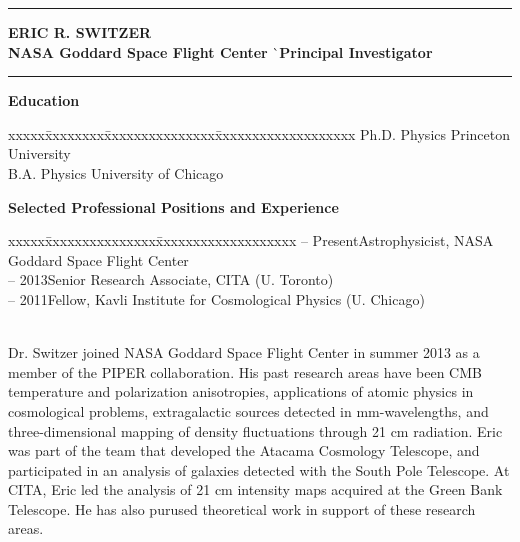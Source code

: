 \documentclass[12pt]{article}
\begin{document}
\hrule height .7pt
\vspace{-3mm}
\noindent
\begin{tabbing}
{\bf ERIC R. SWITZER} \` \\
\small{{\bf NASA Goddard Space Flight Center}} \` \small{{\bf Principal Investigator}} \\
\end{tabbing}
\vspace{-9mm}
\hrule height .7pt

\vspace{5mm}
\small{
\noindent
{\bf Education}
\vspace{-3mm}
\begin{tabbing}
xxxxx\=xxxxxxxx\=xxxxxxxxxxxxxxx\=xxxxxxxxxxxxxxxxxxx\kill
{} \> Ph.D. Physics \> Princeton University \\
 \> B.A. Physics \> University of Chicago \\
\end{tabbing}}

\vspace{-5mm}
\small{
\noindent
{\bf Selected Professional Positions and Experience}
\vspace{-3mm}
\begin{tabbing}
xxxxx\=xxxxxxxxxxxxxxx\=xxxxxxxxxxxxxxxxxxx\kill
{} -- Present\>Astrophysicist, NASA Goddard Space Flight Center \\
 -- 2013\>Senior Research Associate, CITA (U. Toronto) \\
 -- 2011\>Fellow, Kavli Institute for Cosmological Physics (U. Chicago) \\
\end{tabbing}}

\vspace{-2mm} \small{ \\ Dr. Switzer joined
NASA Goddard Space Flight Center in summer 2013 as a member of the PIPER
collaboration. His past research areas have been CMB temperature and
polarization anisotropies, applications of atomic physics in cosmological
problems, extragalactic sources detected in mm-wavelengths, and
three-dimensional mapping of density fluctuations through 21 cm radiation. Eric
was part of the team that developed the Atacama Cosmology Telescope, and
participated in an analysis of galaxies detected with the South Pole Telescope.
At CITA, Eric led the analysis of 21 cm intensity maps acquired at the Green
Bank Telescope. He has also purused theoretical work in support of these
research areas.  }

\vspace{5mm}
\begin{list}{}{%
\setlength{\topsep}{0pt}%
\setlength{\leftmargin}{0.1in}%
\setlength{\listparindent}{-0.1in}%
\setlength{\itemindent}{-0.1in}%
\setlength{\parsep}{\parskip}%
}%

%
\end{list}
\end{document}
